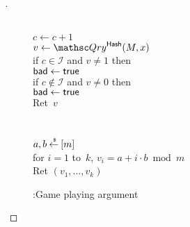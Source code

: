 \begin{proof}[]
\begin{figure}
{{%
%
\\
$c \gets c+1$\\
$v \gets \Qry^{\HashOracle}(M,x)$\\
if $c \in \mathcal{I}$ and $v\neq 1$ then\\
\nudge $\mathsf{bad} \gets \mathsf{true}$ \\
if $c \not\in \mathcal{I}$ and $v\neq 0$ then\\
\nudge $\mathsf{bad} \gets \mathsf{true}$\\
Ret~$v$\\\\
%
\\
$a,b {\:\stackrel{{\scriptscriptstyle \hspace{0.2em}\$}} {\leftarrow}\:} [m]$\\
for $i = 1$ to~$k$, $v_i = a+i \cdot b \bmod m$\\
Ret $\left(v_1,\ldots,v_k\right)$
}
}
\caption{:Game playing argument}\label{fig:Game}
\end{figure}


\end{proof}
